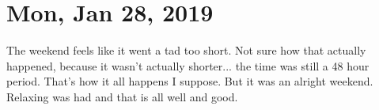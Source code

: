 \section{Mon, Jan 28, 2019}

The weekend feels like it went a tad too short. Not sure how that actually happened,
because it wasn't actually shorter... the time was still a 48 hour period. That's how
it all happens I suppose. But it was an alright weekend. Relaxing was had and that is
all well and good.